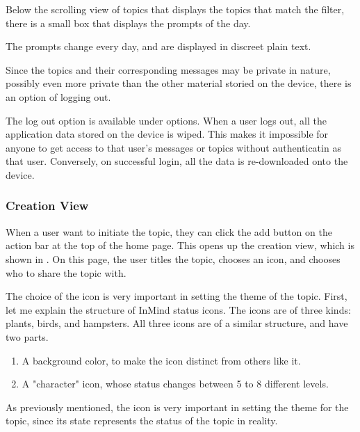       Below the scrolling view of topics that displays the topics
      that match the filter, there is a small box that displays the prompts of the day.

      The prompts change every day, and are displayed in discreet plain text.

      Since the topics and their corresponding messages may be private in nature,
      possibly even more private than the other material storied on the device,
      there is an option of logging out.

      The log out option is available under options.
      When a user logs out, all the application data stored on the device is wiped.
      This makes it impossible for anyone to get access to that user's
      messages or topics without authenticatin as that user.
      Conversely, on successful login, all the data is re-downloaded onto the device.

      \subsubsection{Creation View}
      When a user want to initiate the topic,
      they can click the add button on the action bar at the top of the home page.
      This opens up the creation view, which is shown in \cite{}.
      On this page, the user titles the topic,
      chooses an icon, and chooses who to share the topic with.

      The choice of the icon is very important in setting the theme of the topic.
      First, let me explain the structure of InMind status icons.
      The icons are of three kinds: plants, birds, and hampsters.
      All three icons are of a similar structure, and have two parts.
      \begin{enumerate}
      \item A background color, to make the icon distinct from others like it.
      \item A "character" icon, whose status changes between 5 to 8 different levels.
      \end{enumerate}
      As previously mentioned, the icon is very important in setting
      the theme for the topic, since its state represents the status of the topic
      in reality.

